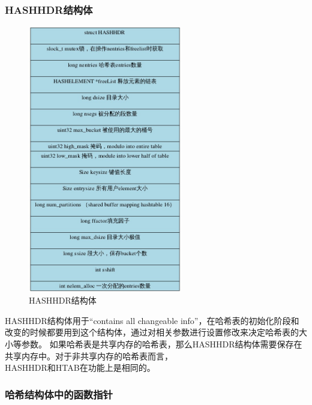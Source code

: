 \documentclass{article}
\begin{document}
\begin{CJK*}{UTF8}{gkai}
\subsubsection{HASHHDR结构体}
\begin{figure}[H]
	\centering
	\includegraphics[width=0.6\textwidth]{hashhdr.jpg}
	\caption{HASHHDR结构体}
\end{figure}
\indent HASHHDR结构体用于“contains all changeable info”，在哈希表的初始化阶段和改变的时候都要用到这个结构体，通过对相关参数进行设置修改来决定哈希表的大小等参数。
\indent 如果哈希表是共享内存的哈希表，那么HASHHDR结构体需要保存在共享内存中。对于非共享内存的哈希表而言，\\HASHHDR和HTAB在功能上是相同的。
\subsubsection{哈希结构体中的函数指针}


\end{CJK*}
\end{document}
